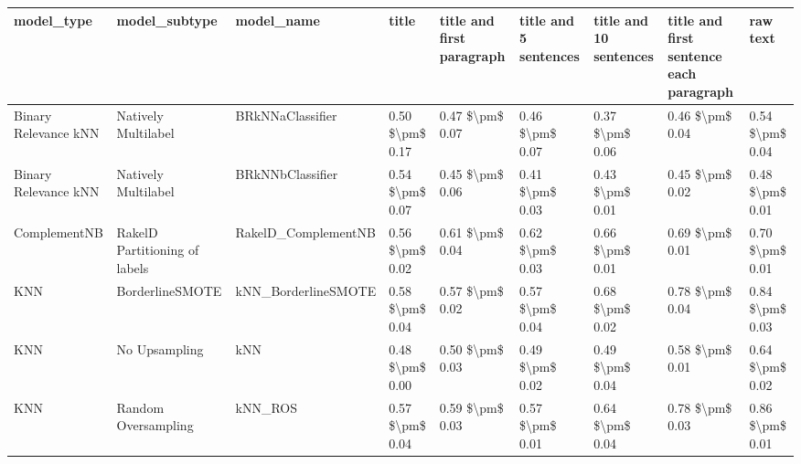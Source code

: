 \begin{tabular}{lllllllll}
\toprule
                     model\_type &                 model\_subtype &                                   model\_name &               title & title and first paragraph & title and 5 sentences & title and 10 sentences & title and first sentence each paragraph &        raw text \\
\midrule
           Binary Relevance kNN &           Natively Multilabel &                             BRkNNaClassifier &     0.50 \$\textbackslash pm\$ 0.17 &           0.47 \$\textbackslash pm\$ 0.07 &       0.46 \$\textbackslash pm\$ 0.07 &        0.37 \$\textbackslash pm\$ 0.06 &                         0.46 \$\textbackslash pm\$ 0.04 & 0.54 \$\textbackslash pm\$ 0.04 \\
           Binary Relevance kNN &           Natively Multilabel &                             BRkNNbClassifier &     0.54 \$\textbackslash pm\$ 0.07 &           0.45 \$\textbackslash pm\$ 0.06 &       0.41 \$\textbackslash pm\$ 0.03 &        0.43 \$\textbackslash pm\$ 0.01 &                         0.45 \$\textbackslash pm\$ 0.02 & 0.48 \$\textbackslash pm\$ 0.01 \\
                   ComplementNB & RakelD Partitioning of labels &                          RakelD\_ComplementNB &     0.56 \$\textbackslash pm\$ 0.02 &           0.61 \$\textbackslash pm\$ 0.04 &       0.62 \$\textbackslash pm\$ 0.03 &        0.66 \$\textbackslash pm\$ 0.01 &                         0.69 \$\textbackslash pm\$ 0.01 & 0.70 \$\textbackslash pm\$ 0.01 \\
                            KNN &               BorderlineSMOTE &                          kNN\_BorderlineSMOTE &     0.58 \$\textbackslash pm\$ 0.04 &           0.57 \$\textbackslash pm\$ 0.02 &       0.57 \$\textbackslash pm\$ 0.04 &        0.68 \$\textbackslash pm\$ 0.02 &                         0.78 \$\textbackslash pm\$ 0.04 & 0.84 \$\textbackslash pm\$ 0.03 \\
                            KNN &                 No Upsampling &                                          kNN &     0.48 \$\textbackslash pm\$ 0.00 &           0.50 \$\textbackslash pm\$ 0.03 &       0.49 \$\textbackslash pm\$ 0.02 &        0.49 \$\textbackslash pm\$ 0.04 &                         0.58 \$\textbackslash pm\$ 0.01 & 0.64 \$\textbackslash pm\$ 0.02 \\
                            KNN &           Random Oversampling &                                      kNN\_ROS &     0.57 \$\textbackslash pm\$ 0.04 &           0.59 \$\textbackslash pm\$ 0.03 &       0.57 \$\textbackslash pm\$ 0.01 &        0.64 \$\textbackslash pm\$ 0.04 &                         0.78 \$\textbackslash pm\$ 0.03 & 0.86 \$\textbackslash pm\$ 0.01 \\

\end{tabular}
